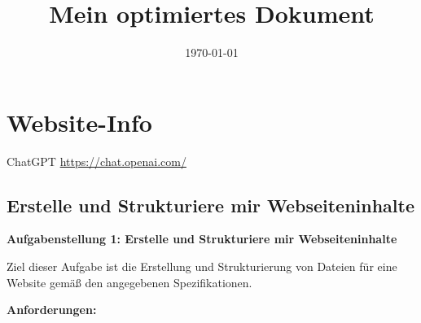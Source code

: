 \documentclass[12pt,a4paper]{scrartcl}
\title{Mein optimiertes Dokument}
\date{\today}
\begin{document}
\maketitle

\hypertarget{website-info}{%
\section{Website-Info}\label{website-info}}

ChatGPT \url{https://chat.openai.com/}

\hypertarget{erstelle-und-strukturiere-mir-webseiteninhalte}{%
\subsection{Erstelle und Strukturiere mir
Webseiteninhalte}\label{erstelle-und-strukturiere-mir-webseiteninhalte}}

\textbf{Aufgabenstellung 1: Erstelle und Strukturiere mir
Webseiteninhalte}

Ziel dieser Aufgabe ist die Erstellung und Strukturierung von Dateien
für eine Website gemäß den angegebenen Spezifikationen.

\textbf{Anforderungen:}
\end{document}
